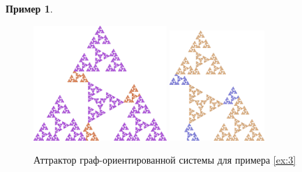 \documentclass[a4paper,14pt]{extarticle} %
\newcommand{\0}{\varnothing}
\newcommand{\8}{\infty}
\theoremstyle{definition}
\newtheorem{example}{Пример}
\begin{document}
\begin{example}
\begin{figure}[H]
    \centering
    \includegraphics[width=0.45\textwidth]{den_tr_1.png}
    \hfill
    \includegraphics[width=0.32\textwidth]{den_tr_2.png}
    \caption{Аттрактор граф-ориентированной системы для примера \ref{ex:3}}
    \label{fig:pr3}
\end{figure}
\end{example}
\end{document}
